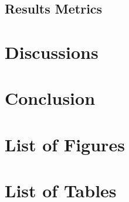 \documentclass[11pt]{article}
\begin{document}
        \subsection{Results Metrics}
    
    \FloatBarrier
    \section{Discussions}

    \FloatBarrier
    \section{Conclusion}

    \FloatBarrier
    \appendix
    
	

	\section{List of Figures}
		\makeatletter
		\makeatother

	\section{List of Tables}
		\makeatletter
		\makeatother
\end{document}
